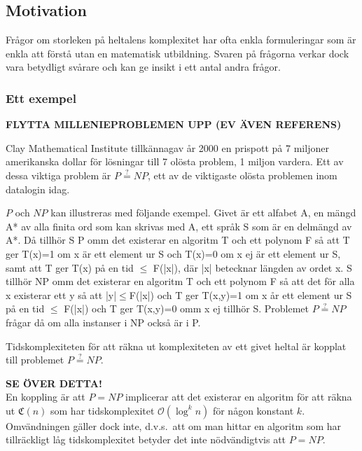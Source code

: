 \documentclass[a4paper,titlepage]{article}
\newcommand{\C}[1]{\mathfrak C \left( #1 \right)}
\newcommand{\FIX}[1]{{\color{red} \bf #1}}
\renewcommand{\O}{\mathcal {O}}
\theoremstyle{definition}
\begin{document}
	  \subsection{Motivation}
	
	Frågor om storleken på heltalens komplexitet har ofta enkla formuleringar som är enkla att 	förstå utan en matematisk utbildning.
    Svaren på frågorna verkar dock vara betydligt svårare och kan ge insikt i ett antal andra frågor.	
	
	\subsubsection{Ett exempel}

    \FIX{FLYTTA MILLENIEPROBLEMEN UPP (EV ÄVEN REFERENS)}

	Clay Mathematical Institute tillkännagav år 2000 en prispott på 7 miljoner amerikanska dollar 	för lösningar till 7 olösta problem, 1 miljon vardera. Ett av dessa viktiga problem är $P \stackrel{?}{=} NP$, ett av de viktigaste olösta problemen inom datalogin idag.

		
	$P$ och $NP$ kan illustreras med följande exempel. 
	Givet är ett alfabet A,
	en mängd A* av alla finita ord som kan skrivas med A,
	ett språk S som är en delmängd av A*. Då
	tillhör S P omm det existerar en algoritm T och ett polynom F så att T ger T(x)=1 om x är ett element ur S och T(x)=0 om x ej är ett element ur S,
    samt att T ger T(x) på en tid 	$\le$ F(|x|), där |x| betecknar längden av ordet x.
	S tillhör NP omm det existerar en algoritm T och ett polynom F så att det för alla x existerar ett
    y så att |y|$\le$F(|x|) och T ger T(x,y)=1 om x år ett element ur S på en tid $\le$ F(|x|) och T
	ger T(x,y)=0 omm x ej tillhör S. Problemet $P \stackrel{?}{=} NP$ frågar då om alla instanser i NP också är i P.
    
    Tidskomplexiteten för att räkna ut komplexiteten av ett 
	givet heltal är kopplat till problemet $P \stackrel{?}{=} NP$.
    
	\FIX{SE ÖVER DETTA!} \\
    En koppling är att $P = NP$  implicerar att det existerar en algoritm för
    att räkna ut $\C{n}$ som har tidskomplexitet $\O(\log^k n)$ 
    för någon konstant $k$. Omvändningen gäller dock inte, d.v.s.\
    att om man hittar en algoritm som har tillräckligt låg tidskomplexitet
    betyder det inte nödvändigtvis att $P=NP$.
	 
\end{document}
